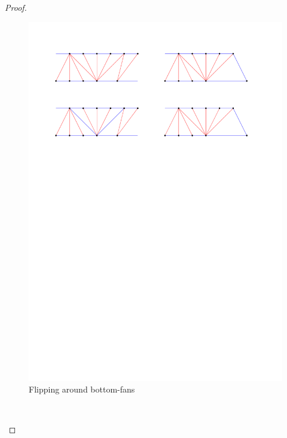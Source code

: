 \begin{proof}
  \begin{figure}[h]
    \centering
    \includegraphics[scale=1]{unifiedAlgo/img/bottomFanFlips}
    \caption{Flipping around bottom-fans}
    \label{fig:uni:bottomFanFlips}
  \end{figure}

  \begin{figure}
      \centering
      \begin{subfigure}[b]{0.45\textwidth}
          \caption{}
      \end{subfigure}
      ~
      \begin{subfigure}[b]{0.45\textwidth}
          \caption{}
      \end{subfigure}
      	\caption{}
  \label{fig:uni:undesirableStructures}
  \end{figure}
\end{proof}

